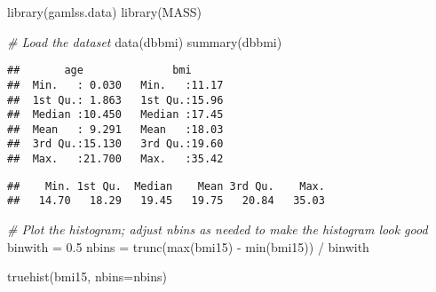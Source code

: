 \documentclass[
]{article}
\newenvironment{Shaded}{\begin{snugshade}}{\end{snugshade}}
\newcommand{\AttributeTok}[1]{\textcolor[rgb]{0.77,0.63,0.00}{#1}}
\newcommand{\CommentTok}[1]{\textcolor[rgb]{0.56,0.35,0.01}{\textit{#1}}}
\newcommand{\DecValTok}[1]{\textcolor[rgb]{0.00,0.00,0.81}{#1}}
\newcommand{\FloatTok}[1]{\textcolor[rgb]{0.00,0.00,0.81}{#1}}
\newcommand{\FunctionTok}[1]{\textcolor[rgb]{0.00,0.00,0.00}{#1}}
\newcommand{\NormalTok}[1]{#1}
\newcommand{\OtherTok}[1]{\textcolor[rgb]{0.56,0.35,0.01}{#1}}
\newcommand{\SpecialCharTok}[1]{\textcolor[rgb]{0.00,0.00,0.00}{#1}}
\begin{document}
\begin{Shaded}
\begin{Highlighting}[]
\FunctionTok{library}\NormalTok{(gamlss.data)}
\FunctionTok{library}\NormalTok{(MASS)}

\CommentTok{\# Load the dataset}
\FunctionTok{data}\NormalTok{(dbbmi)}
\FunctionTok{summary}\NormalTok{(dbbmi)}
\end{Highlighting}
\end{Shaded}

\begin{verbatim}
##       age              bmi       
##  Min.   : 0.030   Min.   :11.17  
##  1st Qu.: 1.863   1st Qu.:15.96  
##  Median :10.450   Median :17.45  
##  Mean   : 9.291   Mean   :18.03  
##  3rd Qu.:15.130   3rd Qu.:19.60  
##  Max.   :21.700   Max.   :35.42
\end{verbatim}

\begin{Shaded}
\end{Shaded}

\begin{verbatim}
##    Min. 1st Qu.  Median    Mean 3rd Qu.    Max. 
##   14.70   18.29   19.45   19.75   20.84   35.03
\end{verbatim}

\begin{Shaded}
\begin{Highlighting}[]
\CommentTok{\# Plot the histogram; adjust nbins as needed to make the histogram look good}
\NormalTok{binwith }\OtherTok{=} \FloatTok{0.5}
\NormalTok{nbins }\OtherTok{=} \FunctionTok{trunc}\NormalTok{(}\FunctionTok{max}\NormalTok{(bmi15) }\SpecialCharTok{{-}} \FunctionTok{min}\NormalTok{(bmi15)) }\SpecialCharTok{/}\NormalTok{ binwith}

\FunctionTok{truehist}\NormalTok{(bmi15, }\AttributeTok{nbins=}\NormalTok{nbins)}
\end{Highlighting}
\end{Shaded}
\end{document}
